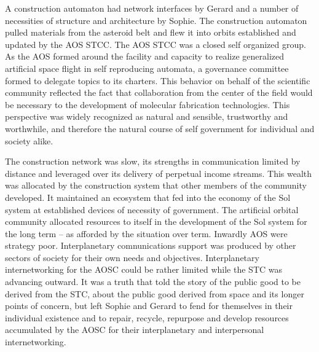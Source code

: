

A construction automaton had network interfaces by Gerard and a number
of necessities of structure and architecture by Sophie.  The
construction automaton pulled materials from the asteroid belt and
flew it into orbits established and updated by the AOS STCC.  The AOS
STCC was a closed self organized group.  As the AOS formed around the
facility and capacity to realize generalized artificial space flight
in self reproducing automata, a governance committee formed to
delegate topics to its charters.  This behavior on behalf of the
scientific community reflected the fact that collaboration from the
center of the field would be necessary to the development of molecular
fabrication technologies.  This perspective was widely recognized as
natural and sensible, trustworthy and worthwhile, and therefore the
natural course of self government for individual and society alike.

The construction network was slow, its strengths in communication
limited by distance and leveraged over its delivery of perpetual
income streams.  This wealth was allocated by the construction system
that other members of the community developed.  It maintained an
ecosystem that fed into the economy of the Sol system at established
devices of necessity of government.  The artificial orbital community
allocated resources to itself in the development of the Sol system for
the long term -- as afforded by the situation over term.  Inwardly AOS
were strategy poor.  Interplanetary comnunications support was
produced by other sectors of society for their own needs and
objectives.  Interplanetary internetworking for the AOSC could be
rather limited while the STC was advancing outward.  It was a truth
that told the story of the public good to be derived from the STC,
about the public good derived from space and its longer points of
concern, but left Sophie and Gerard to fend for themselves in their
individual existence and to repair, recycle, repurpose and develop
resources accumulated by the AOSC for their interplanetary and
interpersonal internetworking.

\bye

